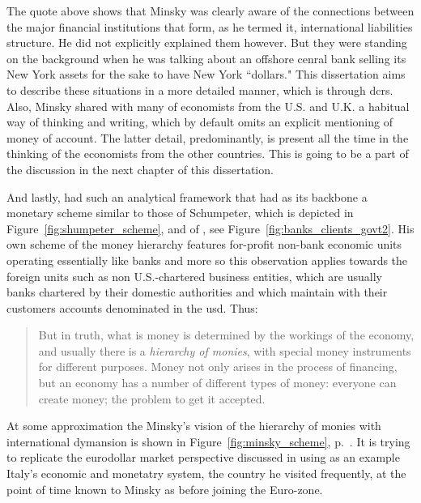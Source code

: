 The quote above shows that Minsky was clearly aware of the connections between the major financial institutions that form, as he termed it, international liabilities structure. He did not explicitly explained them however. But they were standing on the background when he was talking about an offshore cenral bank selling its New York assets for the sake to have New York ``dollars." This dissertation aims to describe these situations in a more detailed manner, which is through \acfp{dcr}. Also, Minsky shared with many of economists from the U.S. and U.K. a habitual way of thinking and writing, which by default omits an explicit mentioning of money of account. The latter detail, predominantly, is present all the time in the thinking of the economists from the other countries. This is going to be a part of the discussion in the next chapter of this dissertation.

And lastly, \citeauthor{minsky1986} had such an analytical framework that had as its backbone a monetary scheme similar to those of Schumpeter, which is depicted in Figure~\ref{fig:shumpeter_scheme}, and of \citeauthor{innes1913}, see Figure~\ref{fig:banks_clients_govt2}. His own scheme of the money hierarchy features for-profit non-bank economic units operating essentially like banks and more so this observation applies towards the foreign units such as non U.S.-chartered business entities, which are usually banks chartered by their domestic authorities and which maintain with their customers accounts denominated in the \acf{usd}. Thus:

\begin{quote}
But in truth, what is money is determined by the workings of the economy, and usually there is a \textit{hierarchy of monies}, with special money instruments for different purposes. Money not only arises in the process of financing, but an economy has a number of different types of money: everyone can create money; the problem to get it accepted.~\citep[p.~255, emphasis added]{minsky1986}
\end{quote}

At some approximation the Minsky's vision of the hierarchy of monies with international dymansion is shown in Figure~\ref{fig:minsky_scheme}, p.~\pageref{fig:minsky_scheme}. It is trying to replicate the eurodollar market perspective discussed in \citep{minsky1985_} using as an example Italy's economic and monetatry system, the country he visited frequently, at the point of time known to Minsky as before joining the Euro-zone. 

